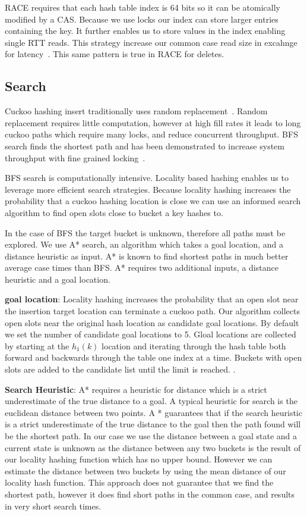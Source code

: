 RACE requires that each hash table index is 64 bits so it
can be atomically modified by a CAS. Because we use locks
our index can store larger entries containing the key. It
further enables us to store values in the index enabling
single RTT reads. This strategy increase our common case
read size in excahnge for latency~.
This same pattern is true in RACE for deletes. 

\subsection{Search}
Cuckoo hashing insert traditionally uses random
replacement~\cite{cuckoo}. Random replacement requires
little computation, however at high fill rates it leads to
long cuckoo paths which require many locks, and reduce
concurrent throughput. BFS search finds the shortest path
and has been demonstrated to increase system throughput with
fine grained locking~\cite{algorithmic-improvements}.

BFS search is computationally intensive. Locality based
hashing enables us to leverage more efficient search
strategies. Because locality hashing increases the
probability that a cuckoo hashing location is close we can
use an informed search algorithm to find open slots close to
bucket a key hashes to. 

In the case of BFS the target bucket is unknown, therefore
all paths must be explored. We use A* search, an algorithm
which takes a goal location, and a distance heuristic as
input. A* is known to find shortest paths in much better
average case times than BFS. A* requires two additional
inputs, a distance heuristic and a goal location.

\textbf{goal location}: Locality hashing increases the
probability that an open slot near the insertion target
location can terminate a cuckoo path. Our algorithm collects
open slots near the original hash location as candidate goal
locations. By default we set the number of candidate goal
locations to 5. Gloal locations are collected by starting at
the $h_1(k)$ location and iterating through the hash
table both forward and backwards through the table one index
at a time. Buckets with open slots are added to the
candidate list until the limit is reached. .

\textbf{Search Heuristic}: A* requires a heuristic for
distance which is a strict underestimate of the true
distance to a goal. A typical heuristic for search is the
euclidean distance between two points. A * guarantees that
if the search heuristic is a strict underestimate of the
true distance to the goal then the path found will be the
shortest path. In our case we use the distance between a
goal state and a current state is unknown as the distance
between any two buckets is the result of our locality
hashing function which has no upper bound. However we can
estimate the distance between two buckets by using the mean
distance of our locality hash function. This approach does
not guarantee that we find the shortest path, however it
does find short paths in the common case, and results in
very short search times.


